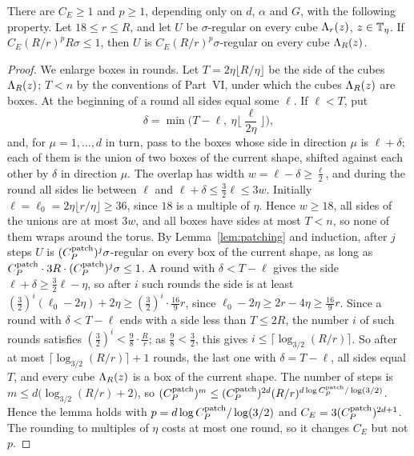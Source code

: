\begin{lemma}\label{lem:large-cubes}
There are $C_E\ge1$ and $p\ge1$, depending only on $d$, $\alpha$ and $G$, with the following property. Let $18\le r\le R$, and let $U$ be $\sigma$-regular on every cube $\Lambda_r(z)$, $z\in\mathbb T_\eta$. If $C_E(R/r)^pR\sigma\le1$, then $U$ is $C_E(R/r)^p\sigma$-regular on every cube $\Lambda_R(z)$.
\end{lemma}

\begin{proof}
We enlarge boxes in rounds. Let $T=2\eta\lfloor R/\eta\rfloor$ be the side of the cubes $\Lambda_R(z)$; $T<n$ by the conventions of Part~VI, under which the cubes $\Lambda_R(z)$ are boxes. At the beginning of a round all sides equal some $\ell$. If $\ell<T$, put
\[
\delta=\min\Big(T-\ell,\ \eta\Big\lfloor\frac{\ell}{2\eta}\Big\rfloor\Big),
\]
and, for $\mu=1,\dots,d$ in turn, pass to the boxes whose side in direction $\mu$ is $\ell+\delta$; each of them is the union of two boxes of the current shape, shifted against each other by $\delta$ in direction $\mu$. The overlap has width $w=\ell-\delta\ge\frac\ell2$, and during the round all sides lie between $\ell$ and $\ell+\delta\le\frac32\ell\le3w$. Initially $\ell=\ell_0=2\eta\lfloor r/\eta\rfloor\ge36$, since $18$ is a multiple of $\eta$. Hence $w\ge18$, all sides of the unions are at most $3w$, and all boxes have sides at most $T<n$, so none of them wraps around the torus. By Lemma~\ref{lem:patching} and induction, after $j$ steps $U$ is $(C^{\rm patch}_P)^j\sigma$-regular on every box of the current shape, as long as $C^{\rm patch}_P\cdot3R\cdot (C^{\rm patch}_P)^j\sigma\le1$. A round with $\delta<T-\ell$ gives the side $\ell+\delta\ge\frac32\ell-\eta$, so after $i$ such rounds the side is at least $(\frac32)^i(\ell_0-2\eta)+2\eta\ge(\frac32)^i\cdot\frac{16}9r$, since $\ell_0-2\eta\ge2r-4\eta\ge\frac{16}9r$. Since a round with $\delta<T-\ell$ ends with a side less than $T\le2R$, the number $i$ of such rounds satisfies $(\frac32)^i<\frac98\cdot\frac Rr$; as $\frac98<\frac32$, this gives $i\le\lceil\log_{3/2}(R/r)\rceil$. So after at most $\lceil\log_{3/2}(R/r)\rceil+1$ rounds, the last one with $\delta=T-\ell$, all sides equal $T$, and every cube $\Lambda_R(z)$ is a box of the current shape. The number of steps is $m\le d\big(\log_{3/2}(R/r)+2\big)$, so $(C^{\rm patch}_P)^m\le (C^{\rm patch}_P)^{2d}(R/r)^{d\log C^{\rm patch}_P/\log(3/2)}$. Hence the lemma holds with $p=d\log C^{\rm patch}_P/\log(3/2)$ and $C_E=3(C^{\rm patch}_P)^{2d+1}$. The rounding to multiples of $\eta$ costs at most one round, so it changes $C_E$ but not $p$.
\end{proof}

